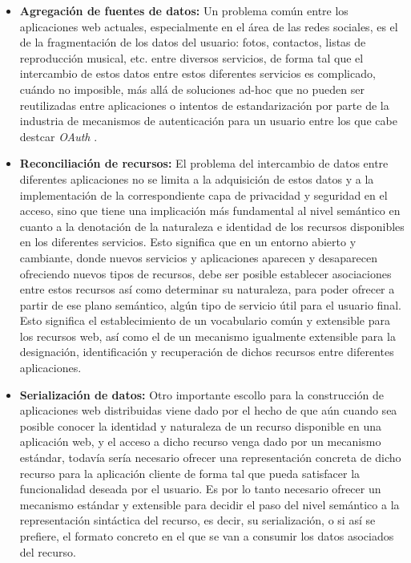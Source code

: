 \begin{itemize}

\item {\bf Agregaci\'on de fuentes de datos:} Un problema com\'un entre los aplicaciones web actuales, especialmente en el \'area de las redes sociales, es el de la fragmentaci\'on de los datos del usuario: fotos, contactos, listas de reproducci\'on musical, etc. entre diversos servicios, de forma tal que el intercambio de estos datos entre estos diferentes servicios es complicado, cu\'ando no imposible, m\'as all\'a de soluciones ad-hoc que no pueden ser reutilizadas entre aplicaciones o intentos de estandarizaci\'on por parte de la industria de mecanismos de autenticaci\'on para un usuario entre los que cabe destcar {\it OAuth} \cite{hammer2010oauth}.

\item {\bf Reconciliaci\'on de recursos:} El problema del intercambio de datos entre diferentes aplicaciones no se limita a la adquisici\'on de estos datos y a la implementaci\'on de la correspondiente capa de privacidad y seguridad en el acceso, sino que tiene una implicaci\'on m\'as fundamental al nivel sem\'antico en cuanto a la denotaci\'on de la naturaleza e identidad de los recursos disponibles en los diferentes servicios. Esto significa que en un entorno abierto y cambiante, donde nuevos servicios y aplicaciones aparecen y desaparecen ofreciendo nuevos tipos de recursos, debe ser posible establecer asociaciones entre estos recursos as\'i como determinar su naturaleza, para poder ofrecer a partir de ese plano sem\'antico, alg\'un tipo de servicio \'util para el usuario final. Esto significa el establecimiento de un vocabulario com\'un y extensible para los recursos web, as\'i como el de un mecanismo igualmente extensible para la designaci\'on, identificaci\'on y recuperaci\'on de dichos recursos entre diferentes aplicaciones.

\item {\bf Serializaci\'on de datos:} Otro importante escollo para la construcci\'on de aplicaciones web distribuidas viene dado por el hecho de que a\'un cuando sea posible conocer la identidad y naturaleza de un recurso disponible en una aplicaci\'on web, y el acceso a dicho recurso venga dado por un mecanismo est\'andar, todav\'ia ser\'ia necesario ofrecer una representaci\'on concreta de dicho recurso para la aplicaci\'on cliente de forma tal que pueda satisfacer la funcionalidad deseada por el usuario. Es por lo tanto necesario ofrecer un mecanismo est\'andar y extensible para decidir el paso del nivel sem\'antico a la representaci\'on sint\'actica del recurso, es decir, su serializaci\'on, o si as\'i se prefiere, el formato concreto en el que se van a consumir los datos asociados del recurso.
\end{itemize}

